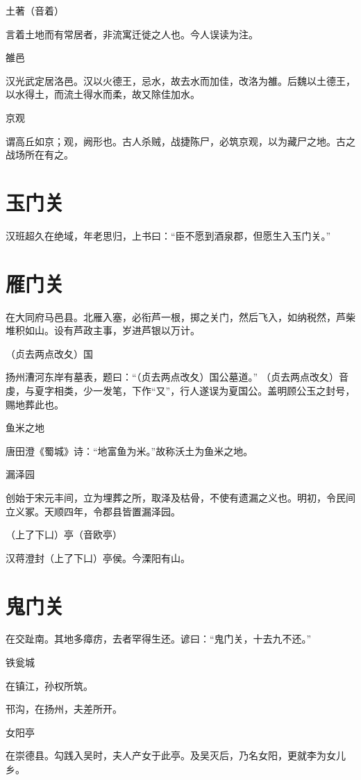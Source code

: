 \documentclass[a4paper,12pt,UTF8,twoside]{ctexbook}
\begin{document}
	土著（音着）
	
	言着土地而有常居者，非流寓迁徙之人也。今人误读为注。
	
	雒邑
	
	汉光武定居洛邑。汉以火德王，忌水，故去水而加佳，改洛为雒。后魏以土德王，以水得土，而流土得水而柔，故又除佳加水。
	
	京观
	
	谓高丘如京；观，阙形也。古人杀贼，战捷陈尸，必筑京观，以为藏尸之地。古之战场所在有之。
	
	\section{玉门关}
	
	汉班超久在绝域，年老思归，上书曰：“臣不愿到酒泉郡，但愿生入玉门关。”
	
	\section{雁门关}
	
	在大同府马邑县。北雁入塞，必衔芦一根，掷之关门，然后飞入，如纳税然，芦柴堆积如山。设有芦政主事，岁进芦银以万计。
	
	（贞去两点改夂）国
	
	扬州漕河东岸有墓表，题曰：“（贞去两点改夂）国公墓道。” （贞去两点改夂）音虔，与夏字相类，少一发笔，下作“又”，行人遂误为夏国公。盖明顾公玉之封号，赐地葬此也。
	
	鱼米之地
	
	唐田澄《蜀城》诗：“地富鱼为米。”故称沃土为鱼米之地。
	
	漏泽园
	
	创始于宋元丰间，立为埋葬之所，取泽及枯骨，不使有遗漏之义也。明初，令民间立义冢。天顺四年，令郡县皆置漏泽园。
	
	（上了下凵）亭（音欧亭）
	
	汉蒋澄封（上了下凵）亭侯。今溧阳有山。
	
	\section{鬼门关}
	
	在交趾南。其地多瘴疠，去者罕得生还。谚曰：“鬼门关，十去九不还。”
	
	铁瓮城
	
	在镇江，孙权所筑。
	
	邗沟，在扬州，夫差所开。
	
	女阳亭
	
	在崇德县。勾践入吴时，夫人产女于此亭。及吴灭后，乃名女阳，更就李为女儿乡。
	
\end{document}
